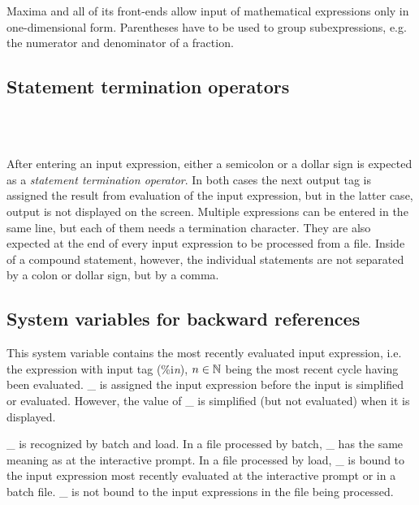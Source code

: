 \documentclass[../Maxima_Workbook.tex]{subfiles}
\begin{document}
Maxima and all of its front-ends allow input of mathematical expressions only in one-dimensional form. Parentheses have to be used to group subexpressions, e.g. the numerator and denominator of a fraction. 

\subsection{Statement termination operators}

\hyt{;}{\tcr{\emph{;}}} \hfill {}\index{;} \\
\hyt{\$}{\tcr{\emph{\$}}} \hfill {}\index{\$} \\
\hyt{,}{\tcr{\emph{,}}} \hfill {}

\lz After entering an input expression, either a semicolon or a dollar sign is expected as a \emph{statement termination operator}. In both cases the next output tag is assigned the result from evaluation of the input expression, but in the latter case, output is not displayed on the screen. Multiple expressions can be entered in the same line, but each of them needs a termination character. They are also expected at the end of every input expression to be processed from a file. Inside of a compound statement, however, the individual statements are not separated by a colon or dollar sign, but by a comma.

\subsection{System variables for backward references}

\lz {} \hfill \tcr{[variable]}\index{\_}

\lz This system variable contains the most recently evaluated input expression, i.e. the expression with input tag (\%i\emph{n}), $ n \in \mathbb{N} $ being the most recent cycle having been evaluated. \_ is assigned the input expression before the input is simplified or evaluated. However, the value of \_ is simplified (but not evaluated) when it is displayed. 

\lz \_ is recognized by batch and load. In a file processed by batch, \_ has the same meaning as at the interactive prompt. In a file processed by load, \_ is bound to the input expression most recently evaluated at the interactive prompt or in a batch file. \_ is not bound to the input expressions in the file being processed.
\end{document}

